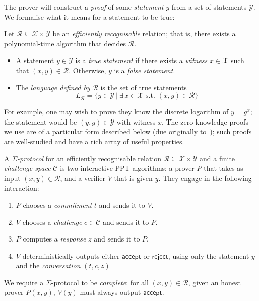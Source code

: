 \documentclass[12pt,a4paper]{article}
\theoremstyle{definition}
\begin{document}
The prover will construct a \textit{proof} of some \textit{statement} $y$ from a set of statements $\mathcal{Y}$. We formalise what it means for a statement to be true:
\begin{definition}
    Let $\mathcal{R}\subseteq\mathcal{X}\times\mathcal{Y}$ be an \textit{efficiently recognisable} relation; that is, there exists a polynomial-time algorithm that decides $\mathcal{R}$.
    \begin{itemize}
        \item A statement $y\in\mathcal{Y}$ is a \textit{true statement} if there exists a \textit{witness} $x\in\mathcal{X}$ such that $(x, y)\in\mathcal{R}$. Otherwise, $y$ is a \textit{false statement}.
        \item The \textit{language defined by} $\mathcal{R}$ is the set of true statements
        $$L_\mathcal{R}=\{y\in\mathcal{Y}\ |\ \exists\, x\in\mathcal{X}\text{ s.t. }(x,y)\in\mathcal{R}\}$$
    \end{itemize}
\end{definition}

For example, one may wish to prove they know the discrete logarithm of $y=g^x$; the statement would be $(y, g)\in\mathcal{Y}$ with witness $x$. The zero-knowledge proofs we use are of a particular form described below (due originally to~\cite{cramer1996modular}); such proofs are well-studied and have a rich array of useful properties.
\begin{definition}
    A $\mathit{\Sigma}$\textit{-protocol} for an efficiently recognisable relation $\mathcal{R}\subseteq\mathcal{X}\times\mathcal{Y}$ and a finite \textit{challenge space} $\mathcal{C}$ is two interactive PPT algorithms: a prover $P$ that takes as input $(x, y)\in\mathcal{R}$, and a verifier $V$ that is given $y$. They engage in the following interaction:
    \begin{enumerate}
        \item $P$ chooses a \textit{commitment} $t$ and sends it to $V$.
        \item $V$ chooses a \textit{challenge} $c\in\mathcal{C}$ and sends it to $P$.
        \item $P$ computes a \textit{response} $z$ and sends it to $P$.
        \item $V$ deterministically outputs either $\mathsf{accept}$ or $\mathsf{reject}$, using only the statement $y$ and the \textit{conversation} $(t, c, z)$
    \end{enumerate}
    We require a $\Sigma$-protocol to be \textit{complete}: for all $(x, y)\in\mathcal{R}$, given an honest prover $P(x, y)$, $V(y)$ must always output $\mathsf{accept}$.
\end{definition}
\end{document}
